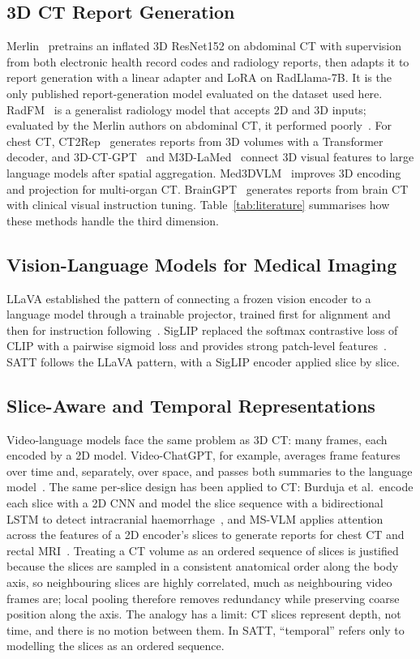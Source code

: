 \documentclass[conference]{IEEEtran}
\begin{document}
\subsection{3D CT Report Generation}
Merlin~\cite{merlin} pretrains an inflated 3D ResNet152 on abdominal CT with
supervision from both electronic health record codes and radiology reports,
then adapts it to report generation with a linear adapter and LoRA on
RadLlama-7B. It is the only published report-generation model evaluated on
the dataset used here. RadFM~\cite{radfm} is a generalist radiology model
that accepts 2D and 3D inputs; evaluated by the Merlin authors on abdominal
CT, it performed poorly~\cite{merlin}. For chest CT, CT2Rep~\cite{ct2rep}
generates reports from 3D volumes with a Transformer decoder, and
3D-CT-GPT~\cite{ct3dgpt} and M3D-LaMed~\cite{m3d} connect 3D visual features
to large language models after spatial aggregation. Med3DVLM~\cite{med3dvlm}
improves 3D encoding and projection for multi-organ CT. BrainGPT~\cite{braingpt}
generates reports from brain CT with clinical visual instruction tuning.
Table~\ref{tab:literature} summarises how these methods handle the third
dimension.

\subsection{Vision-Language Models for Medical Imaging}
LLaVA established the pattern of connecting a frozen vision encoder to a
language model through a trainable projector, trained first for alignment and
then for instruction following~\cite{llava,llava15}. SigLIP replaced the
softmax contrastive loss of CLIP with a pairwise sigmoid loss and provides
strong patch-level features~\cite{siglip}. SATT follows the LLaVA pattern,
with a SigLIP encoder applied slice by slice.

\subsection{Slice-Aware and Temporal Representations}
Video-language models face the same problem as 3D CT: many frames, each
encoded by a 2D model. Video-ChatGPT, for example, averages frame features
over time and, separately, over space, and passes both summaries to the
language model~\cite{videochatgpt}. The same per-slice design has been applied to
CT: Burduja et al.\ encode each slice with a 2D CNN and model the slice
sequence with a bidirectional LSTM to detect intracranial
haemorrhage~\cite{burduja2020}, and MS-VLM applies attention across the
features of a 2D encoder's slices to generate reports for chest CT and
rectal MRI~\cite{msvlm}. Treating a CT volume as an ordered sequence of
slices is justified because the slices are sampled in a consistent
anatomical order along the body axis, so neighbouring slices are highly
correlated, much as neighbouring video frames are; local pooling therefore
removes redundancy while preserving coarse position along the axis. The
analogy has a limit: CT slices represent depth, not time, and there is no
motion between them. In SATT, ``temporal'' refers only to modelling the
slices as an ordered sequence.
\end{document}
